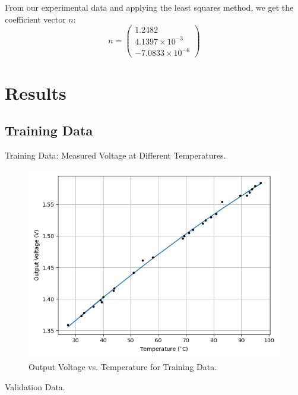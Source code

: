 \documentclass{article}
\begin{document}
	From our experimental data and applying the least squares method, we get the coefficient vector \(n\):
	\[ n = \begin{pmatrix} 1.2482 \\ 4.1397 \times 10^{-3} \\ -7.0833 \times 10^{-6} \end{pmatrix} \]
	
	\section{Results}
	
	\subsection{Training Data}
	\begin{table}[H]
		\centering
		\caption{Training Data: Measured Voltage at Different Temperatures.}
		\label{tab:trainingdata}
	\end{table}
	
\begin{figure}[H]
	\centering
	\includegraphics[width=1\textwidth]{../figs/train}
	\caption{Output Voltage vs. Temperature for Training Data.}
	\label{fig:train}
\end{figure}

\begin{table}[H]
	\centering
	\caption{Validation Data.} %
	\label{tab:validationdata} %
\end{table}
\end{document}
